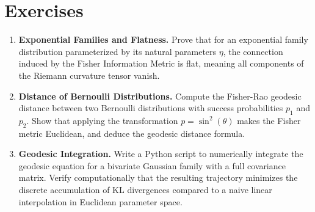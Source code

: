 \section{Exercises}
\begin{enumerate}
    \item \textbf{Exponential Families and Flatness.} Prove that for an exponential family distribution parameterized by its natural parameters $\eta$, the connection induced by the Fisher Information Metric is flat, meaning all components of the Riemann curvature tensor vanish.
    \item \textbf{Distance of Bernoulli Distributions.} Compute the Fisher-Rao geodesic distance between two Bernoulli distributions with success probabilities $p_1$ and $p_2$. Show that applying the transformation $p = \sin^2(\theta)$ makes the Fisher metric Euclidean, and deduce the geodesic distance formula.
    \item \textbf{Geodesic Integration.} Write a Python script to numerically integrate the geodesic equation for a bivariate Gaussian family with a full covariance matrix. Verify computationally that the resulting trajectory minimizes the discrete accumulation of KL divergences compared to a naive linear interpolation in Euclidean parameter space.
\end{enumerate}

